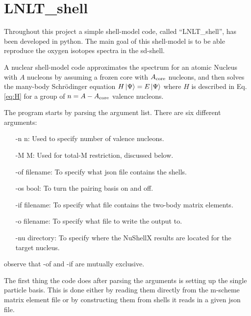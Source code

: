 \section{LNLT\_shell} \label{sec:CodeExpl}

Throughout this project a simple shell-model code, called ``LNLT\_shell'', has been developed in python. The main goal of this shell-model is to be able reproduce the oxygen isotopes spectra in the sd-shell.

A nuclear shell-model code approximates the spectrum for an atomic Nucleus with \(A\) nucleons by assuming a frozen core with \(A_{\rm{core}}\) nucleons, and then solves the many-body Schrödinger equation \(H\ket{\Psi}=E\ket{\Psi}\) where \(H\) is described in Eq. \ref{eq:H}
for a group of \(n=A-A_{\rm{core}}\) valence nucleons.



The program starts by parsing the argument list. There are six different arguments:
\begin{itemize}
\item[-n n:] Used to specify number of valence nucleons.
\item[-M M:] Used for total-M restriction, discussed below.
\item[-of filename:] To specify what json file contains the shells.
\item[-os bool:] To turn the pairing basis on and off.
\item[-if filename:] To specify what file contains the two-body matrix elements.
\item[-o filename:] To specify what file to write the output to.
\item[-nu directory:] To specify where the NuShellX results are located for the target nucleus.
\end{itemize}
observe that -of and -if are mutually exclusive.




The first thing the code does after parsing the arguments is setting up the single particle basis.
This is done either by reading them directly from the m-scheme matrix element file %
or by constructing them from shells it reads in a given json file.


